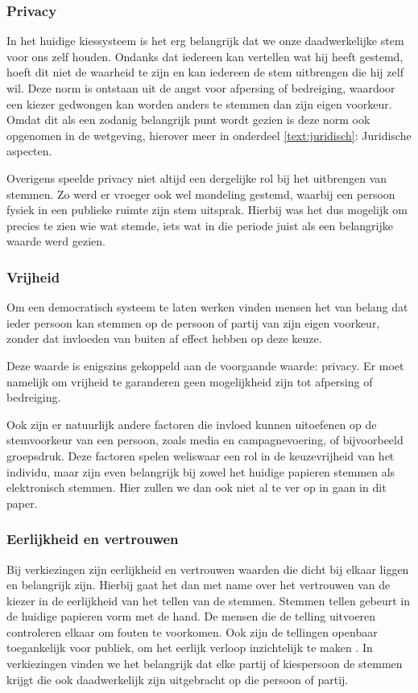 \documentclass[a4paper]{article}
\begin{document}
\subsubsection{Privacy}
In het huidige kiessysteem is het erg belangrijk dat we onze daadwerkelijke stem voor ons zelf houden.
Ondanks dat iedereen kan vertellen wat hij heeft gestemd, hoeft dit niet de waarheid te zijn en kan iedereen de stem uitbrengen die hij zelf wil.
Deze norm is ontstaan uit de angst voor afpersing of bedreiging, waardoor een kiezer gedwongen kan worden anders te stemmen dan zijn eigen voorkeur.
Omdat dit als een zodanig belangrijk punt wordt gezien is deze norm ook opgenomen in de wetgeving, hierover meer in onderdeel \ref{text:juridisch}: Juridische aspecten.

Overigens speelde privacy niet altijd een dergelijke rol bij het uitbrengen van stemmen.
Zo werd er vroeger ook wel mondeling gestemd, waarbij een persoon fysiek in een publieke ruimte zijn stem uitsprak.
Hierbij was het dus mogelijk om precies te zien wie wat stemde, iets wat in die periode juist als een belangrijke waarde werd gezien.

\subsubsection{Vrijheid}
Om een democratisch systeem te laten werken vinden mensen het van belang dat ieder persoon kan stemmen op de persoon of partij van zijn eigen voorkeur, zonder dat invloeden van buiten af effect hebben op deze keuze.

Deze waarde is enigszins gekoppeld aan de voorgaande waarde: privacy. Er moet namelijk om vrijheid te garanderen geen mogelijkheid zijn tot afpersing of bedreiging.

Ook zijn er natuurlijk andere factoren die invloed kunnen uitoefenen op de stemvoorkeur van een persoon, zoals media en campagnevoering, of bijvoorbeeld groepsdruk.
Deze factoren spelen weliswaar een rol in de keuzevrijheid van het individu, maar zijn even belangrijk bij zowel het huidige papieren stemmen als elektronisch stemmen.
Hier zullen we dan ook niet al te ver op in gaan in dit paper.

\subsubsection{Eerlijkheid en vertrouwen}
Bij verkiezingen zijn eerlijkheid en vertrouwen waarden die dicht bij elkaar liggen en belangrijk zijn.
Hierbij gaat het dan met name over het vertrouwen van de kiezer in de eerlijkheid van het tellen van de stemmen.
Stemmen tellen gebeurt in de huidige papieren vorm met de hand.
De mensen die de telling uitvoeren controleren elkaar om fouten te voorkomen.
Ook zijn de tellingen openbaar toegankelijk voor publiek, om het eerlijk verloop inzichtelijk te maken \cite{verkaik12}. 
In verkiezingen vinden we het belangrijk dat elke partij of kiespersoon de stemmen krijgt die ook daadwerkelijk zijn uitgebracht op die persoon of partij.
\end{document}
